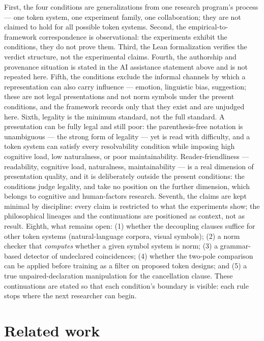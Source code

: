 \documentclass{article} %
\begin{document}
First, the four conditions are generalizations from one research
program's process --- one token system, one experiment family, one
collaboration; they are not claimed to hold for all possible token
systems. Second, the empirical-to-framework correspondence is
observational: the experiments exhibit the conditions, they do not
prove them. Third, the Lean formalization verifies the verdict
structure, not the experimental claims. Fourth, the authorship and
provenance situation is stated in the AI assistance statement above
and is not repeated here. Fifth, the conditions exclude the
informal channels by which a representation can also carry
influence --- emotion, linguistic bias, suggestion; these are not
legal presentations and not norm symbols under the present
conditions, and the framework records only that they exist and are
unjudged here. Sixth, legality is the minimum standard, not
the full standard. A presentation can be fully legal and still
poor: the parenthesis-free notation is unambiguous --- the strong
form of legality --- yet is read with difficulty, and a token
system can satisfy every resolvability condition while imposing
high cognitive load, low naturalness, or poor maintainability.
Reader-friendliness --- readability, cognitive load, naturalness,
maintainability --- is a real dimension of presentation quality,
and it is deliberately outside the present conditions: the
conditions judge legality, and take no position on the further
dimension, which belongs to cognitive and human-factors research.
Seventh, the claims are kept minimal by discipline:
every claim is restricted to what the experiments show; the
philosophical lineages and the continuations are positioned as
context, not as result. Eighth, what remains open: (1) whether the
decoupling clauses suffice for other token systems (natural-language
corpora, visual symbols); (2) a norm checker that \emph{computes}
whether a given symbol system is norm; (3) a grammar-based detector
of undeclared coincidences; (4) whether the two-pole comparison can
be applied before training as a filter on proposed token designs;
and (5) a true unpaired-declaration manipulation for the
cancellation clause. These continuations are stated so that each
condition's boundary is visible: each rule stops where the next
researcher can begin.

\section{Related work}
\end{document}
